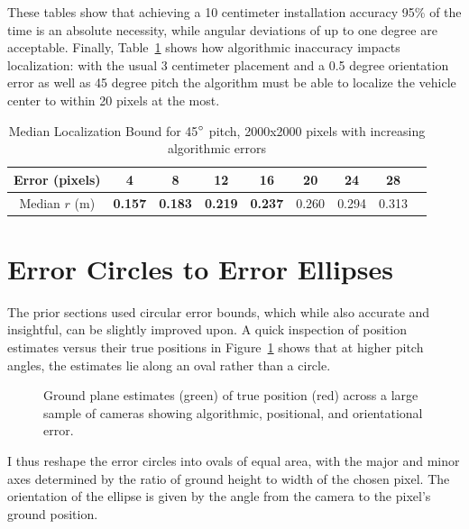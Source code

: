 \documentclass[a4paper,12pt,twoside,openright]{report}
\begin{document}
These tables show that achieving a 10 centimeter installation accuracy 95\% of the time is an absolute necessity, while angular deviations of up to
one degree are acceptable. Finally, Table~\ref{tab:camera:alg} shows how algorithmic inaccuracy impacts localization:
with the usual 3 centimeter placement and a 0.5 degree orientation error as well as 45 degree pitch the algorithm must be able to
localize the vehicle center to within 20 pixels at the most. 

\begin{table}[htb]
\centering
\caption{Median Localization Bound for 45$\degree$ pitch, 2000x2000 pixels with increasing algorithmic errors}
\label{tab:camera:alg}
\begin{tabular}{ccccccccc}
\toprule
Error (pixels) & 4 & 8 & 12 & 16 & 20 & 24 & 28 \\ \midrule
Median $r$ (m)	&  \textbf{0.157} & \textbf{0.183} & \textbf{0.219} & \textbf{0.237} & 0.260 & 0.294 & 0.313 \\
\end{tabular} 
\end{table}

\section{Error Circles to Error Ellipses}

The prior sections used circular error bounds, which while also accurate and insightful,
can be slightly improved upon. A quick inspection of position estimates versus their true
positions in Figure~\ref{fig:camera:distributions} shows that at higher pitch angles, the estimates lie 
along an oval rather than a circle.

\begin{figure}[htb]
    \begin{center}
        
    \end{center}
    \caption[Distribution of Estimates]{Ground plane estimates (green) of true position (red) across a large sample of cameras showing algorithmic, positional, and orientational error.}
    \label{fig:camera:distributions}
\end{figure}

I thus reshape the error circles into ovals of equal area, with the major
and minor axes determined by the ratio of ground height to width of the chosen pixel.
The orientation of the ellipse is given by the angle from the camera to the pixel's
ground position.
\end{document}
